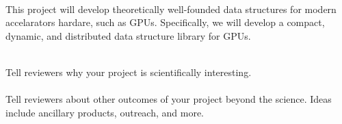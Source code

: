 \\

\noindent This project will develop theoretically well-founded data structures for modern accelarators hardare, such as GPUs. Specifically, we will develop a compact, dynamic, and distributed data structure library for GPUs.


\\

\noindent Tell reviewers why your project is scientifically interesting.\\

\\

\noindent Tell reviewers about other outcomes of your project beyond the science. Ideas include ancillary products, outreach, and more.